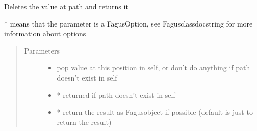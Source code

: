 \documentclass[a4paper,10pt,english]{sphinxmanual}
\begin{document}
\begin{fulllineitems}
\begin{fulllineitems}
\begin{quote}
\begin{description}
\end{description}\end{quote}

\end{fulllineitems}


\begin{fulllineitems}
\label{\detokenize{fagus.fagus:fagus.fagus.Fagus.pop}}
\pysigstartsignatures
{}
\pysigstopsignatures
\sphinxAtStartPar
Deletes the value at path and returns it

\sphinxAtStartPar
* means that the parameter is a FagusOption, see Fagus\sphinxhyphen{}class\sphinxhyphen{}docstring for more information about options
\begin{quote}\begin{description}
\item[{Parameters}] \leavevmode\begin{itemize}
\item {}
\sphinxAtStartPar
{} \textendash{} pop value at this position in self, or don’t do anything if path doesn’t exist in self

\item {}
\sphinxAtStartPar
{} \textendash{} * returned if path doesn’t exist in self

\item {}
\sphinxAtStartPar
{} \textendash{} * return the result as Fagus\sphinxhyphen{}object if possible (default is just to return the result)


\end{itemize}
\end{description}
\end{quote}
\end{fulllineitems}
\end{fulllineitems}
\end{document}
